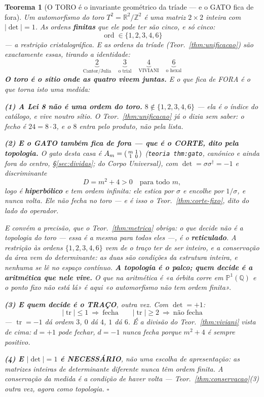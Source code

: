 \documentclass[11pt,a4paper]{article}
\newtheorem{teorema}{Teorema}
\newcommand{\code}[1]{\texttt{\small #1}}
\newcommand{\abs}[1]{\lvert #1\rvert}
\newcommand{\dg}{^{\dagger}}
\begin{document}
\begin{teorema}[O TORO é o invariante geométrico da tríade --- e o GATO fica de
fora]\label{thm:toro}
Um automorfismo do toro $T^{2}=\mathbb{R}^{2}/\mathbb{Z}^{2}$ é uma matriz $2\times2$
\emph{inteira} com $\abs{\det}=1$. As ordens \textbf{finitas} que ele pode ter são cinco,
e só cinco:
\[
\boxed{\;\operatorname{ord}\in\{1,2,3,4,6\}\;}
\]
--- a restrição cristalográfica. E as ordens da tríade (Teor.~\ref{thm:unificacao}) são
\emph{exactamente} essas, tirando a identidade:
\[
\underbrace{2}_{\text{Cantor/Julia}}\quad
\underbrace{3}_{\text{o trial}}\quad
\underbrace{4}_{\text{VIVIANI}}\quad
\underbrace{6}_{\text{o hexal}}
\]
\textbf{O toro é o sítio onde as quatro vivem juntas.} E o que fica de FORA é o que torna
isto uma medida:

\textbf{(1) A Lei 8 não é uma ordem do toro.} $8\notin\{1,2,3,4,6\}$ --- ela é o
\emph{índice} do catálogo, e vive noutro sítio. O Teor.~\ref{thm:unificacao} já o dizia
sem saber: o fecho é $24=8\cdot3$, e o $8$ entra pelo produto, não pela lista.

\textbf{(2) E o GATO também fica de fora --- que é o CORTE, dito pela topologia.} O gato
desta casa é $A_m=\begin{psmallmatrix}m&1\\1&0\end{psmallmatrix}$ (\code{teoria thm:gato}, canónico e ainda fora do centro, \S\ref{sec:dividas}; do
\emph{Corpo Universal}), com $\det=\sigma\sigma\dg=-1$ e discriminante
\[
D=m^{2}+4>0\quad\text{para todo }m,
\]
logo é \textbf{hiperbólico} e tem ordem \emph{infinita}: ele estica por $\sigma$ e
encolhe por $1/\sigma$, e nunca volta. \emph{Ele não fecha no toro} --- e é isso o
Teor.~\ref{thm:corte-fixo}, dito do lado do operador.

\emph{E convém a precisão, que o Teor.~\ref{thm:metrica} obriga}: o que decide não é a
topologia do toro --- essa é a mesma para todos eles ---, é o \textbf{reticulado}. A
restrição às ordens $\{1,2,3,4,6\}$ vem de o traço ter de ser \emph{inteiro}, e a
conservação da área vem do \emph{determinante}: as duas são condições da estrutura
inteira, e nenhuma se lê no espaço contínuo. \textbf{A topologia é o palco; quem decide é
a aritmética que nele vive.} O que na aritmética é «a órbita corre
em $\mathbb{P}^1(\mathbb{Q})$ e o ponto fixo não está lá» é aqui «o automorfismo não tem
ordem finita».

\textbf{(3) E quem decide é o TRAÇO}, outra vez. Com $\det=+1$:
\[
\abs{\operatorname{tr}}\le1\ \Rightarrow\ \text{fecha}\qquad
\abs{\operatorname{tr}}\ge2\ \Rightarrow\ \text{não fecha}
\]
--- $\operatorname{tr}=-1$ dá ordem $3$, $0$ dá $4$, $1$ dá $6$. É a divisão do
Teor.~\ref{thm:viviani} vista de cima: $d=+1$ pode fechar, $d=-1$ nunca fecha porque
$m^{2}+4$ é sempre positivo.

\textbf{(4) E $\abs{\det}=1$ é NECESSÁRIO}, não uma escolha de apresentação: as matrizes
inteiras de determinante diferente \emph{nunca} têm ordem finita. \emph{A conservação da
medida é a condição de haver volta} --- Teor.~\ref{thm:conservacao}(3) outra vez, agora
como topologia. $\square$
\end{teorema}
\end{document}
